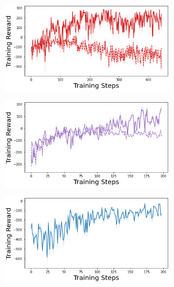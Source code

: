 \begin{figure}
    \begin{subfigure}{.24\textwidth}
        \includegraphics[width=\textwidth]{sections/011_icml2022/resources/lunarlander-training_total_reward-dropout-training-strategy.png}
    \end{subfigure}
    \begin{subfigure}{.24\textwidth}
        \includegraphics[width=\textwidth]{sections/011_icml2022/resources/lunarlander-training_total_reward-ensemble-training-strategy.png}
    \end{subfigure}
    \begin{subfigure}{.24\textwidth}
        \includegraphics[width=\textwidth]{sections/011_icml2022/resources/lunarlander-training_total_reward-dkl-training-strategy.png}

\end{subfigure}
\end{figure}
